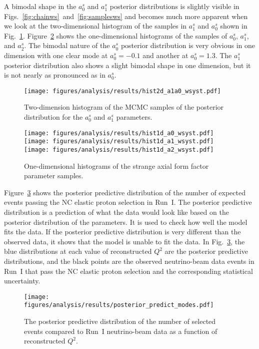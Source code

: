     A bimodal shape in the $a_0^s$ and $a_1^s$ posterior distributions is
    slightly visible in Figs.~\ref{fig:chainws}~and~\ref{fig:samplesws} and
    becomes much more apparent when we look at the two-dimensional histogram of
    the samples in $a_1^s$ and $a_0^s$ shown in Fig.~\ref{fig:hist2da1a0}.
    Figure~\ref{fig:hist1dws} shows the one-dimensional histograms of the
    samples of $a_0^s$, $a_1^s$, and $a_2^s$. The bimodal nature of the $a_0^s$
    posterior distribution is very obvious in one dimension with one clear mode
    at $a_0^s = -0.1$ and another at $a_0^s = 1.3$. The $a_1^s$ posterior
    distribution also shows a slight bimodal shape in one dimension, but it is
    not nearly as pronounced as in $a_0^s$.
    \begin{figure}[h]
      \centering
      \texttt{[image: figures/analysis/results/hist2d\_a1a0\_wsyst.pdf]} \\
      \caption{Two-dimension histogram of the MCMC samples of the posterior
      distribution for the $a_0^s$ and $a_1^s$ parameters.}
      \label{fig:hist2da1a0}
    \end{figure}
    \begin{figure}[h]
      \centering
      \texttt{[image: figures/analysis/results/hist1d\_a0\_wsyst.pdf]} 
      \texttt{[image: figures/analysis/results/hist1d\_a1\_wsyst.pdf]} 
      \texttt{[image: figures/analysis/results/hist1d\_a2\_wsyst.pdf]}
      \caption{One-dimensional histograms of the strange axial form factor
      parameter samples.}
      \label{fig:hist1dws}
    \end{figure}

    Figure~\ref{fig:postpred} shows the posterior predictive distribution of
    the number of expected events passing the NC elastic proton selection in
    Run~I. The posterior predictive distribution is a prediction of what the
    data would look like based on the posterior distribution of the parameters.
    It is used to check how well the model fits the data. If the posterior
    predictive distribution is very different than the observed data, it shows
    that the model is unable to fit the data. In Fig.~\ref{fig:postpred}, the
    blue distributions at each value of reconstructed $Q^2$ are the posterior
    predictive distributions, and the black points are the observed
    neutrino-beam data events in Run~I that pass the NC elastic proton
    selection and the corresponding statistical uncertainty.
    \begin{figure}[h]
      \centering
      \texttt{[image: figures/analysis/results/posterior\_predict\_modes.pdf]} 
      \caption{The posterior predictive distribution of the number of selected
      events compared to Run~I neutrino-beam data as a function of
      reconstructed $Q^2$.}
      \label{fig:postpred}
    \end{figure}

